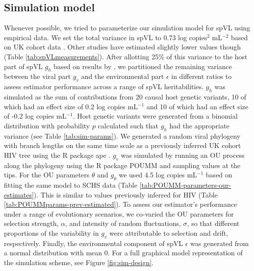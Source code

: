 \documentclass[11pt]{article}
\begin{document}
\begin{linenumbers}
\subsection*{Simulation model}

Whenever possible, we tried to parameterize our simulation model for spVL using empirical data. We set the total variance in spVL to 0.73 log copies$^2$ mL$^{-2}$ based on UK cohort data \citep{Mitov2018}. Other studies have estimated slightly lower values though (Table \ref{tab:spVLmeasurements}). After allotting 25\% of this variance to the host part of spVL $g_h$ based on results by \citet{McLaren2015}, we partitioned the remaining variance between the viral part $g_v$ and the environmental part $\epsilon$ in different ratios to assess estimator performance across a range of spVL heritabilities. $g_h$ was simulated as the sum of contributions from 20 causal host genetic variants, 10 of which had an effect size of 0.2 log copies mL$^{-1}$ and 10 of which had an effect size of -0.2 log copies mL$^{-1}$. Host genetic variants were generated from a binomial distribution with probability $p$ calculated such that $g_h$ had the appropriate variance (see Table \ref{tab:sim-params}). We generated a random viral phylogeny with branch lengths on the same time scale as a previously inferred UK cohort HIV tree \citep{Hodcroft2014} using the R package ape \citep{Paradis2018}. $g_v$ was simulated by running an OU process along the phylogeny using the R package POUMM \citep{Mitov2017a-POUMM} and sampling values at the tips. For the OU parameters $\theta$ and $g_{0}$ we used 4.5 log copies mL$^{-1}$ based on fitting the same model to SCHS data (Table \ref{tab:POUMM-parameters-our-estimates}). This is similar to values previously inferred for HIV (Table \ref{tab:POUMMparams-prev-estimated}). To assess our estimator's performance under a range of evolutionary scenarios, we co-varied the OU parameters for selection strength, $\alpha$, and intensity of random fluctuations, $\sigma$, so that different proportions of the variability in $g_v$ were attributable to selection and drift, respectively. Finally, the environmental component of spVL $\epsilon$ was generated from a normal distribution with mean 0.  For a full graphical model representation of the simulation scheme, see Figure \ref{fig:sim-design}.


\end{linenumbers}
\end{document}

